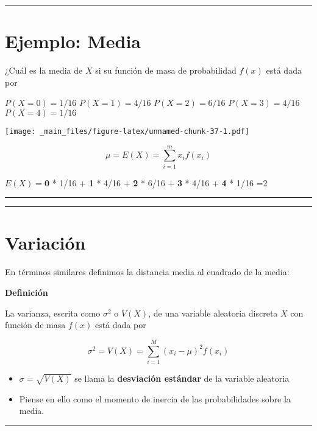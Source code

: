 \documentclass[
]{book}
\begin{document}
\begin{center}\rule{0.5\linewidth}{0.5pt}\end{center}

\hypertarget{ejemplo-media}{%
\section{Ejemplo: Media}\label{ejemplo-media}}

¿Cuál es la media de \(X\) si su función de masa de probabilidad \(f(x)\) está dada por

\(P(X=0)=1/16\)
\(P(X=1)=4/16\)
\(P(X=2)=6/16\)
\(P(X=3)=4/16\)
\(P(X=4)=1/16\)

\texttt{[image: \_main\_files/figure-latex/unnamed-chunk-37-1.pdf]}

\[\mu =E(X)=\sum_{i=1}^m x_i f(x_i)\]

\(E(X)=\)\textbf{0} * 1/16 + \textbf{1} * 4/16 + \textbf{2} * 6/16 + \textbf{3} * 4/16 + \textbf{4} * 1/16 =2

\begin{center}\rule{0.5\linewidth}{0.5pt}\end{center}

\begin{center}\rule{0.5\linewidth}{0.5pt}\end{center}

\hypertarget{variaciuxf3n}{%
\section{Variación}\label{variaciuxf3n}}

En términos similares definimos la distancia media al cuadrado de la media:

\textbf{Definición}

La varianza, escrita como \(\sigma^2\) o \(V(X)\), de una variable aleatoria discreta \(X\) con función de masa \(f(x)\) está dada por

\[\sigma^2 = V(X)= \sum_{i=1}^M (x_i-\mu)^2 f(x_i)\]

\begin{itemize}
\item
  \(\sigma=\sqrt{V(X)}\) se llama la \textbf{desviación estándar} de la variable aleatoria
\item
  Piense en ello como el momento de inercia de las probabilidades sobre la media.
\end{itemize}

\begin{center}\rule{0.5\linewidth}{0.5pt}\end{center}
\end{document}
